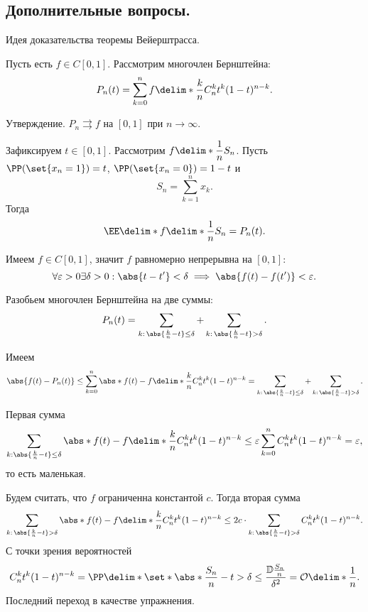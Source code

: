 \subsection{Дополнительные вопросы.}

Идея доказательства теоремы Вейерштрасса. 

Пусть есть $f \in C[0, 1]$. Рассмотрим многочлен Бернштейна:
\begin{equation*}
    P_n(t) = \sum_{k = 0}^n f\delim*{\frac{k}{n}}C_n^k t^k(1 - t)^{n - k}.
\end{equation*}

Утверждение. $P_n \rightrightarrows f$ на $[0, 1]$ при $n \to \infty$.

Зафиксируем $t \in [0, 1]$. Рассмотрим $\displaystyle f\delim*{\frac 1n S_n}$. Пусть $\PP(\set{x_n = 1}) = t$, $\PP(\set{x_n = 0}) = 1 - t$ и
\begin{equation*}
    S_n = \sum_{k = 1}^n x_k.
\end{equation*}
Тогда
\begin{equation*}
    \EE\delim*{f\delim*{\frac 1n S_n}} = P_n(t).
\end{equation*}

Имеем $f \in C[0, 1]$, значит $f$ равномерно непрерывна на $[0, 1]$:
\begin{equation*}
    \forall \varepsilon > 0 \exists \delta > 0: \abs{t - t'} < \delta \implies \abs{f(t) - f(t')} < \varepsilon.
\end{equation*}

Разобьем многочлен Бернштейна на две суммы:
\begin{equation*}
    P_n(t) = \sum_{k: \, \abs{\frac kn - t} \leq \delta} + \sum_{k: \, \abs{\frac kn - t} > \delta}.
\end{equation*}

Имеем
\begin{equation*}
    \abs{f(t) - P_n(t)} \leq \sum_{k = 0}^n \abs*{f(t) - f\delim*{\frac{k}{n}}}C_n^k t^k(1 - t)^{n - k} = \sum_{k: \,  \abs{\frac kn - t} \leq \delta} + \sum_{k: \, \abs{\frac kn - t} > \delta}. 
\end{equation*}

Первая сумма
\begin{equation*}
    \sum_{k: \abs{\frac kn - t} \leq \delta} \abs*{f(t) - f\delim*{\frac{k}{n}}}C_n^k t^k(1 - t)^{n - k} \leq \varepsilon \sum_{k = 0}^n C_n^k t^k(1 - t)^{n - k} = \varepsilon,
\end{equation*}
то есть маленькая.

Будем считать, что $f$ ограниченна константой $c$. Тогда вторая сумма
\begin{equation*}
    \sum_{k: \, \abs{\frac kn - t} > \delta} \abs*{f(t) - f\delim*{\frac{k}{n}}}C_n^k t^k(1 - t)^{n - k} \leq 2c\cdot \sum_{k: \, \abs{\frac kn - t} > \delta} C_n^k t^k(1 - t)^{n - k}.
\end{equation*}
С точки зрения вероятностей
\begin{equation*}
    C_n^k t^k(1 - t)^{n - k} = \PP\delim*{\set*{\abs*{\frac{S_n}{n} - t} > \delta}} \leq \frac{\mathbb{D} \frac{S_n}{n}}{\delta^2} = \mathcal{O}\delim*{\frac 1n}.
\end{equation*}
Последний переход в качестве упражнения.

